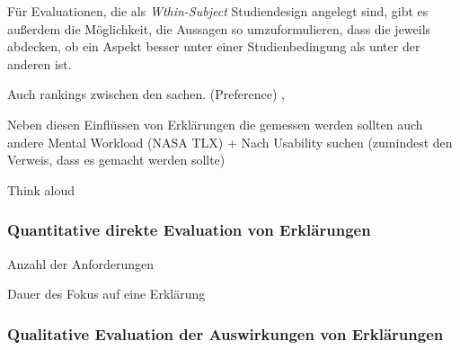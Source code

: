Für Evaluationen, die als \textit{Wthin-Subject} Studiendesign angelegt sind, gibt es außerdem die Möglichkeit, die Aussagen so umzuformulieren, dass die jeweils abdecken, ob ein Aspekt besser unter einer Studienbedingung als unter der anderen ist.

Auch rankings zwischen den sachen. (Preference) \cite{kouki_user_2017} \cite{mucha_interfaces_2021} 
\cite{abdulrahman_belief-based_2019} 
\cite{waa_evaluating_2021} \cite{wiegand_id_2020} ,
\cite{stange_effects_2021} \cite{kaptein_personalised_2017} 

Neben diesen Einflüssen von Erklärungen die gemessen werden sollten auch andere  Mental Workload     (NASA TLX)  \cite{wiegand2019drive, wiegand_id_2020,du2019look} +  Nach Usability suchen (zumindest den Verweis, dass es gemacht werden sollte)

Think aloud \cite{wiegand_id_2020} \cite{yamada_evaluating_2016} \\

\subsubsection{Quantitative direkte Evaluation von Erklärungen}

Anzahl der Anforderungen

Dauer des Fokus auf eine Erklärung

\subsubsection{Qualitative Evaluation der Auswirkungen von Erklärungen}


